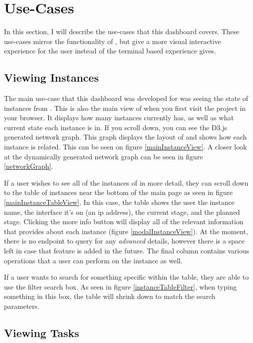 \section{Use-Cases}
\label{makereference2.4}

In this section, I will describe the use-cases that this dashboard covers. These use-cases mirror the functionality of \ancorcli{}, but give a more visual interactive experience for the user instead of the terminal based experience \ancorcli{} gives.

\subsection{Viewing Instances}

The main use-case that this dashboard was developed for was seeing the state of instances from \ancor{}. This is also the main view of \projectName{} when you first visit the project in your browser. It displays how many instances \ancor{} currently has, as well as what current state each instance is in. If you scroll down, you can see the D3.js generated network graph. This graph displays the layout of \ancor{} and shows how each instance is related. This can be seen on figure \ref{mainInstanceView}. A closer look at the dynamically generated network graph can be seen in figure \ref{networkGraph}.

If a user wishes to see all of the instances of \ancor{} in more detail, they can scroll down to the table of instances near the bottom of the main page as seen in figure \ref{mainInstanceTableView}. In this case, the table shows the user the instance name, the interface it's on (an ip address), the current stage, and the planned stage. Clicking the more info button will display all of the relevant information that \ancor{} provides about each instance (figure \ref{modalInstanceView}). At the moment, there is no \ancor{} endpoint to query for any \emph{advanced} details, however there is a space left in case that feature is added in the future. The final column contains various operations that a user can perform on the instance as well.

If a user wants to search for something specific within the table, they are able to use the filter search box. As seen in figure \ref{instanceTableFilter}, when typing something in this box, the table will shrink down to match the search parameters.

\subsection{Viewing Tasks}

